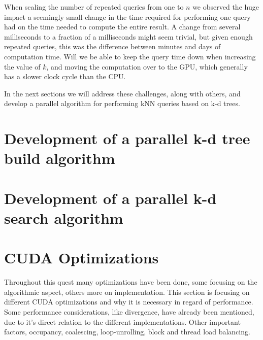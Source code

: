 When scaling the number of repeated queries from one to $n$ we observed the huge impact a seemingly small change in the time required for performing one query had on the time needed to compute the entire result. A change from several milliseconds to a fraction of a milliseconds might seem trivial, but given enough repeated queries, this was the difference between minutes and days of computation time. Will we be able to keep the query time down when increasing the value of $k$, and moving the computation over to the GPU, which generally has a slower clock cycle than the CPU.

In the next sections we will address these challenges, along with others, and develop a parallel algorithm for performing kNN queries based on k-d trees.

\section{Development of a parallel k-d tree build algorithm} %
\label{sec:development_of_a_parallel_k_d_tree_build_algorithm}



\section{Development of a parallel k-d search algorithm} %
\label{sec:development_of_a_parallel_k_d_search_algorithm}




\section{CUDA Optimizations} %
\label{sec:cuda_optimizations}

Throughout this quest many optimizations have been done, some focusing on the algorithmic aspect, others more on implementation. This section is focusing on different CUDA optimizations and why it is necessary in regard of performance. Some performance considerations, like divergence, have already been mentioned, due to it's direct relation to the different implementations. Other important factors, occupancy, coalescing, loop-unrolling, block and thread load balancing.

